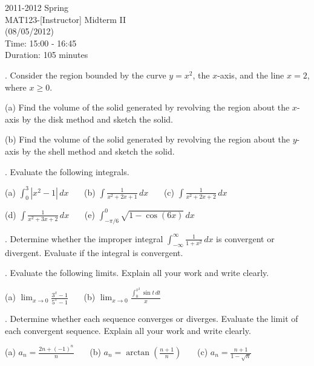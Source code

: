 \documentclass{article}
\begin{document}
\large

\begin{center}
2011-2012 Spring \\MAT123-[Instructor] Midterm II\\(08/05/2012)\\Time: 15:00 - 16:45\\Duration: 105 minutes
\end{center}

. Consider the region bounded by the curve $y=x^2$, the $x$-axis, and the line $x=2$, where $x\geq0$.

\hfill

(a) Find the volume of the solid generated by revolving the region about the $x$-axis by the disk method and sketch the solid.

\hfill

(b) Find the volume of the solid generated by revolving the region about the $y$-axis by the shell method and sketch the solid.

\hfill

. Evaluate the following integrals.

\hfill

(a) $\displaystyle \int_0^3\left|x^2-1\right|\, dx$ \ \ \ (b) $\displaystyle\int\frac1{x^2+2x+1}\,dx$ \ \ \ (c) $\displaystyle\int\frac1{x^2+2x+2}\,dx$

\hfill

(d) $\displaystyle\int\frac1{x^2+3x+2}\,dx$ \ \ \ (e) $\displaystyle\int_{-\pi/6}^0\sqrt{1-\cos(6x)}\,dx$

\hfill

. Determine whether the improper integral $\displaystyle\int_{-\infty}^\infty\frac1{1+x^2}\,dx$ is convergent or divergent. Evaluate if the integral is convergent.

\hfill

. Evaluate the following limits. Explain all your work and write clearly.

\hfill

(a) $\displaystyle\lim_{x\to0}\frac{3^x-1}{5^x-1}$ \ \ \ (b) $\displaystyle \lim_{x\to0}\frac{\displaystyle\int_0^{x^2}\sin t\,dt}x$

\hfill

. Determine whether each sequence converges or diverges. Evaluate the limit of each convergent sequence. Explain all your work and write clearly.

\hfill

(a) $\displaystyle a_n=\frac{2n+(-1)^n}n$ \ \ \ (b) $\displaystyle a_n=\arctan\left(\frac{n+1}n\right)$ \ \ \ (c) $\displaystyle a_n = \frac{n+1}{1-\sqrt n}$
\end{document}
